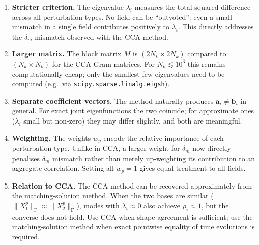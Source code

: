\documentclass[a4paper,11pt]{article}
\newcommand{\va}{\bm{a}}
\newcommand{\vb}{\bm{b}}
\newcommand{\Xb}[2]{X_{#1}^{#2}}
\newcommand{\frob}[1]{\lVert #1 \rVert_{\mathrm{F}}}
\newcommand{\Nk}{N_k}
\theoremstyle{plain}
\begin{document}
\begin{enumerate}
    \item \textbf{Stricter criterion.} The eigenvalue $\lambda_i$ measures
    the total squared difference across all perturbation types.
    No field can be ``outvoted'': even a small mismatch in a single field
    contributes positively to $\lambda_i$.
    This directly addresses the $\delta_m$ mismatch observed with the CCA method.

    \item \textbf{Larger matrix.} The block matrix $M$ is $(2\Nk\times 2\Nk)$
    compared to $(\Nk\times\Nk)$ for the CCA Gram matrices.
    For $\Nk \lesssim 10^3$ this remains computationally cheap; only the
    smallest few eigenvalues need to be computed (e.g.\ via
    \texttt{scipy.sparse.linalg.eigsh}).

    \item \textbf{Separate coefficient vectors.} The method naturally produces
    $\va_i \neq \vb_i$ in general.
    For exact joint eigenfunctions the two coincide; for approximate ones
    ($\lambda_i$ small but non-zero) they may differ slightly, and both are
    meaningful.

    \item \textbf{Weighting.} The weights $w_p$ encode the relative importance
    of each perturbation type.
    Unlike in CCA, a larger weight for $\delta_m$ now directly penalises
    $\delta_m$ mismatch rather than merely up-weighting its contribution to an
    aggregate correlation.
    Setting all $w_p = 1$ gives equal treatment to all fields.

    \item \textbf{Relation to CCA.} The CCA method can be recovered
    approximately from the matching-solution method.
    When the two bases are similar ($\frob{\Xb{1}{p}} \approx \frob{\Xb{2}{p}}$),
    modes with $\lambda_i \approx 0$ also achieve $\rho_i \approx 1$, but
    the converse does not hold.
    Use CCA when shape agreement is sufficient; use the matching-solution method
    when exact pointwise equality of time evolutions is required.
\end{enumerate}
\end{document}
